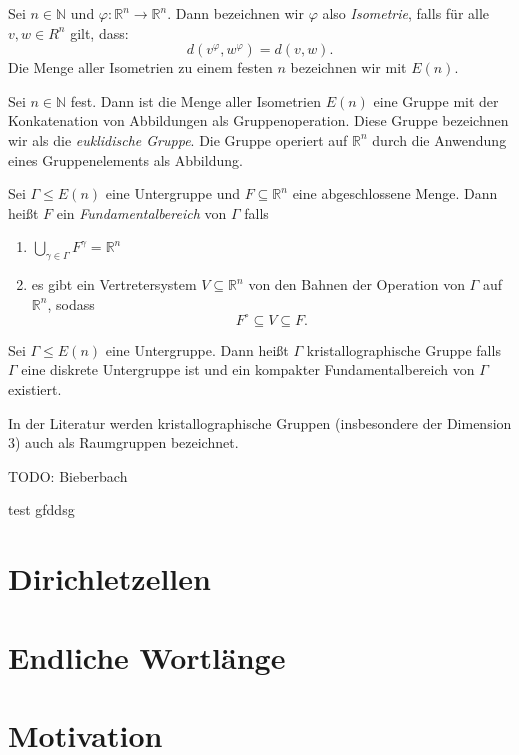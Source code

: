 \documentclass{beamer}
\theoremstyle{plain}
\newcommand\R{\mathbb R}
\newcommand\N{\mathbb N}
\renewcommand{\phi}{\varphi}
\begin{document}
\begin{frame}
    \begin{definition}
        Sei $n \in \N$ und $\phi: \R^n \to \R^n$. Dann bezeichnen wir $\phi$ also \emph{Isometrie}, falls für alle $v, w \in R^n$ gilt, dass:
        $$
            d(v^\phi, w^\phi) = d(v, w).
        $$\pause
        Die Menge aller Isometrien zu einem festen $n$ bezeichnen wir mit $E(n)$.
    \end{definition}
    \pause
    \begin{proposition}
        Sei $n \in \N$ fest. Dann ist die Menge aller Isometrien $E(n)$ eine Gruppe mit der Konkatenation von Abbildungen als Gruppenoperation.
        Diese Gruppe bezeichnen wir als die \emph{euklidische Gruppe}. Die Gruppe operiert auf $\R^n$ durch die Anwendung eines Gruppenelements als Abbildung.
    \end{proposition}
\end{frame}
\begin{frame}
    \begin{definition}
        Sei $\Gamma \leq E(n)$ eine Untergruppe und $F \subseteq \R^n$ eine abgeschlossene Menge. Dann heißt $F$ ein \emph{Fundamentalbereich} von $\Gamma$ falls
        \begin{enumerate}[label=(\roman*)]
            \item $\bigcup_{\gamma \in \Gamma} F^\gamma = \R^n$\pause
            \item es gibt ein Vertretersystem $V \subseteq \R^n$ von den Bahnen der Operation von $\Gamma$ auf $\R^n$, sodass
                $$
                    F^\circ \subseteq V \subseteq F.
                $$
        \end{enumerate}
    \end{definition}

    \pause
    \begin{definition}
        Sei $\Gamma \leq E(n)$ eine Untergruppe. Dann heißt $\Gamma$ kristallographische Gruppe falls $\Gamma$ eine diskrete Untergruppe ist und ein kompakter Fundamentalbereich von $\Gamma$ existiert.
    \end{definition}
    In der Literatur werden kristallographische Gruppen (insbesondere der Dimension $3$) auch als Raumgruppen bezeichnet.
\end{frame}

\begin{frame}
    TODO: Bieberbach
\end{frame}

\begin{frame}
    \begin{alertblock}{test}
        gfddsg
    \end{alertblock}
\end{frame}

\section{Dirichletzellen}

\section{Endliche Wortlänge}

\section{Motivation}
\end{document}
